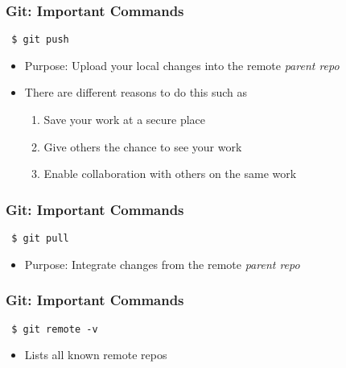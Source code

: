 \documentclass{beamer} %
\begin{document}
\begin{frame}[t, fragile]
\frametitle{Git: Important Commands}

\begin{verbatim} 
 $ git push
\end{verbatim}

\begin{itemize}
    \setlength\itemsep{1em}
	\item Purpose: Upload your local changes into the remote \emph{parent repo}
	\item There are different reasons to do this such as

	\begin{enumerate}
    	\setlength\itemsep{0.4em}
		\item Save your work at a secure place
        \item Give others the chance to see your work
        \item Enable collaboration with others on the same work
	\end{enumerate}

\end{itemize}
\end{frame}

\begin{frame}[t, fragile]
\frametitle{Git: Important Commands}

\begin{verbatim} 
 $ git pull
\end{verbatim}

\begin{itemize}
	\item Purpose: Integrate changes from the remote \emph{parent repo}
\end{itemize}
\end{frame}


\begin{frame}[t, fragile]
\frametitle{Git: Important Commands}

\begin{verbatim} 
 $ git remote -v
\end{verbatim}

\begin{itemize}
	\item Lists all known remote repos
\end{itemize}
\end{frame}
\end{document}
